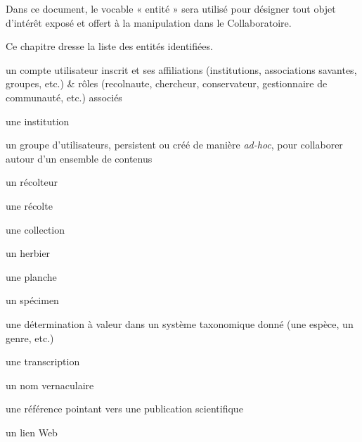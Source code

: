 \startchapter[title={Les types d'entités ReColNat+},reference=c:entites]

Dans ce document, le vocable « entité » sera utilisé pour désigner tout objet d'intérêt exposé et offert à la manipulation dans le Collaboratoire.

Ce chapitre dresse la liste des entités identifiées.

\startsection[title={Identification des entités}]


\startsubsection[title={Entités sociales}]

\startitemize
	\item un compte utilisateur inscrit et ses affiliations (institutions, associations savantes, groupes, etc.) & rôles (recolnaute, chercheur, conservateur, gestionnaire de communauté, etc.) associés
	\item une institution
	\item un groupe d'utilisateurs, persistent ou créé de manière {\it ad-hoc}, pour collaborer autour d'un ensemble de contenus
\stopitemize

\startsubsection[title={Entités scientifiques},reference=c:entites:scientifiques]

\startitemize
	\item un récolteur
	\item une récolte
	\item une collection
	\item un herbier
	\item une planche
	\item un spécimen
	\item une détermination à valeur dans un système taxonomique donné (une espèce, un genre, etc.)
	\item une transcription
	\item un nom vernaculaire
	\item une référence pointant vers une publication scientifique
	\item un lien Web
\stopitemize

